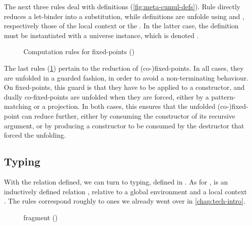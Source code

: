 \begin{figure*}
  \ContinuedFloat
  \caption{Computation rules for definitions ()}
  \label{fig:meta-cumul-defs}
\end{figure*}

The next three rules deal with definitions (\cref{fig:meta-cumul-defs}).
Rule  directly reduces a
let-binder into a substitution, while definitions are unfolde using  and ,
respectively those of the local context or the . In the latter
case, the definition must be instantiated with a universe instance, which is denoted .

\begin{figure}[h]
  \ContinuedFloat
  \caption{Computation rules for fixed-points ()}
  \label{fig:meta-cumul-fix}
\end{figure}

The last rules (\cref{fig:meta-cumul-fix}) pertain to the reduction of (co-)fixed-points.
In all cases, they are unfolded in a guarded fashion, in order to avoid a non-terminating behaviour.
On fixed-points, this guard is that they have to be applied to a constructor,
and dually co-fixed-points are unfolded when
they are forced, either by a pattern-matching or a projection. In both cases, this ensures that
the unfolded (co-)fixed-point can reduce further, either by consuming the constructor of
its recursive argument, or by producing a constructor to be consumed by the destructor
that forced the unfolding.

\FloatBarrier
\subsection{Typing}

With the  relation defined, we can turn to typing, defined in .
As for , 
is an inductively defined relation ,
relative to a global environment  and a local context .
The rules correspond roughly to ones we already went over in \cref{chap:tech-intro}.

\begin{figure}
  \ContinuedFloat*
  \caption{ fragment ()}
  \label{fig:meta-typing-ccw}
\end{figure}

